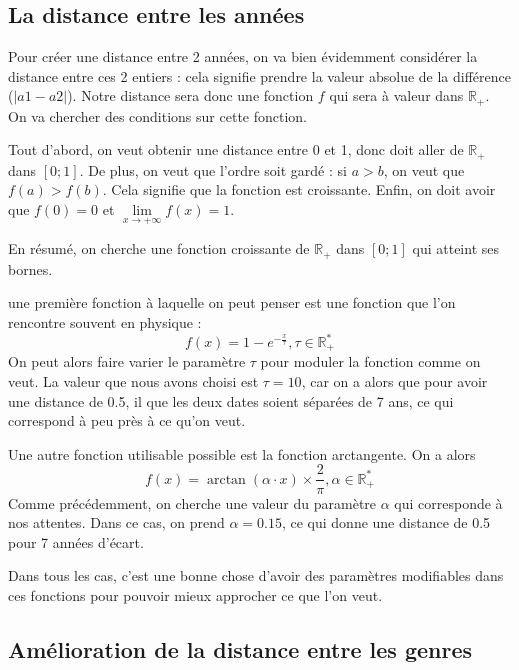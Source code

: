 \documentclass{report}
\begin{document}
\subsection{La distance entre les années}
Pour créer une distance entre 2 années, on va bien évidemment considérer la distance entre ces 2 entiers : cela signifie prendre la valeur absolue de la différence (\(|a1-a2|\)). Notre distance sera donc une fonction $f$ qui sera à valeur dans $\mathds{R}_{+}$. On va chercher des conditions sur cette fonction.\par
Tout d'abord, on veut obtenir une distance entre 0 et 1, donc doit aller de $\mathds{R}_{+}$ dans \([0;1]\). De plus, on veut que l'ordre soit gardé : si \(a>b\), on veut que \(f(a)>f(b)\). Cela signifie que la fonction est croissante. Enfin, on doit avoir que $f(0)=0$ et $\lim\limits_{x \rightarrow +\infty} f(x)=1$.\par
En résumé, on cherche une fonction croissante de $\mathds{R}_{+}$ dans $[0;1]$ qui atteint ses bornes.\par
une première fonction à laquelle on peut penser est une fonction que l'on rencontre souvent en physique : 
\[f(x)=1-e^{-\frac{x}{\tau}} , \tau \in \mathds{R}_{+}^{*}\]
On peut alors faire varier le paramètre $\tau$ pour moduler la fonction comme on veut. La valeur que nous avons choisi est $\tau=10$, car on a alors que pour avoir une distance de 0.5, il que les deux dates soient séparées de 7 ans, ce qui correspond à peu près à ce qu'on veut.\par
Une autre fonction utilisable possible est la fonction arctangente. On a alors
\[f(x)=\arctan(\alpha \cdot x)\times \frac{2}{\pi} , \alpha \in \mathds{R}_{+}^{*}\]
Comme précédemment, on cherche une valeur du paramètre $\alpha$ qui corresponde à nos attentes. Dans ce cas, on prend $\alpha=0.15$, ce qui donne une distance de 0.5 pour 7 années d'écart.\par
Dans tous les cas, c'est une bonne chose d'avoir des paramètres modifiables dans ces fonctions pour pouvoir mieux approcher ce que l'on veut.
\subsection{Amélioration de la distance entre les genres}
\end{document}
